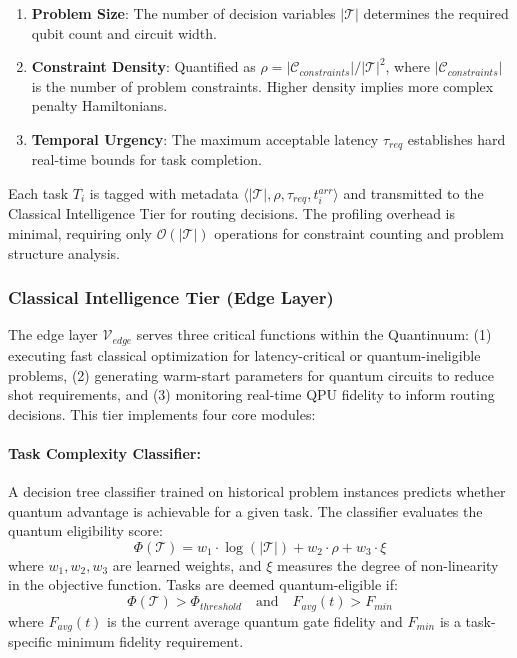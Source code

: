 \documentclass[lettersize,journal]{IEEEtran}
\begin{document}
\begin{enumerate}[leftmargin=*]
    \item \textbf{Problem Size}: The number of decision variables $|\mathcal{T}|$ determines the required qubit count and circuit width.
    
    \item \textbf{Constraint Density}: Quantified as $\rho = |\mathcal{C}_{constraints}|/|\mathcal{T}|^2$, where $|\mathcal{C}_{constraints}|$ is the number of problem constraints. Higher density implies more complex penalty Hamiltonians.
    
    \item \textbf{Temporal Urgency}: The maximum acceptable latency $\tau_{req}$ establishes hard real-time bounds for task completion.
\end{enumerate}

Each task $T_i$ is tagged with metadata $\langle |\mathcal{T}|, \rho, \tau_{req}, t_i^{arr} \rangle$ and transmitted to the Classical Intelligence Tier for routing decisions. The profiling overhead is minimal, requiring only $\mathcal{O}(|\mathcal{T}|)$ operations for constraint counting and problem structure analysis.

\subsubsection{Classical Intelligence Tier (Edge Layer)}

The edge layer $\mathcal{V}_{edge}$ serves three critical functions within the Quantinuum: (1) executing fast classical optimization for latency-critical or quantum-ineligible problems, (2) generating warm-start parameters for quantum circuits to reduce shot requirements, and (3) monitoring real-time QPU fidelity to inform routing decisions. This tier implements four core modules:

\paragraph{Task Complexity Classifier:}
A decision tree classifier trained on historical problem instances predicts whether quantum advantage is achievable for a given task. The classifier evaluates the quantum eligibility score:
\begin{equation}
\Phi(\mathcal{T}) = w_1 \cdot \log(|\mathcal{T}|) + w_2 \cdot \rho + w_3 \cdot \xi
\label{eq:complexity_score}
\end{equation}
where $w_1, w_2, w_3$ are learned weights, and $\xi$ measures the degree of non-linearity in the objective function. Tasks are deemed quantum-eligible if:
\begin{equation}
\Phi(\mathcal{T}) > \Phi_{threshold} \quad \text{and} \quad F_{avg}(t) > F_{min}
\label{eq:quantum_eligibility}
\end{equation}
where $F_{avg}(t)$ is the current average quantum gate fidelity and $F_{min}$ is a task-specific minimum fidelity requirement.
\end{document}
